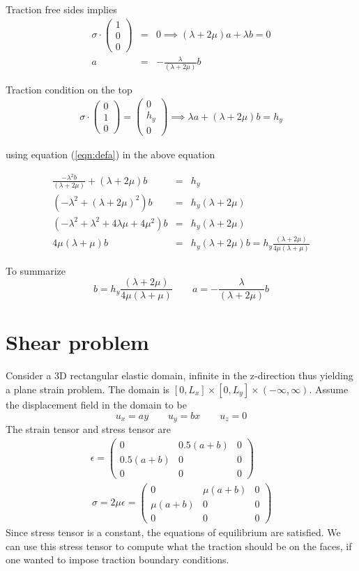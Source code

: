 \documentclass[12pt]{article}
\newcommand{\beq}{\begin{equation}}
\newcommand{\eeq}{\end{equation}}
\newcommand{\ber}{\begin{eqnarray}}
\newcommand{\eer}{\end{eqnarray}}
\begin{document}
      
 Traction free sides implies
      \ber
      \sigma\cdot\begin{pmatrix}1 \\ 0 \\ 0\end{pmatrix} &=& 0 \implies      (\lambda+2\mu)a + \lambda{b}=0 \\
      a &=& -\frac{\lambda}{(\lambda+2\mu)}b \label{eqn:defa}
      \eer

      Traction condition on the top
      \ber
      \sigma\cdot\begin{pmatrix}0\\1\\0\end{pmatrix} = \begin{pmatrix}0\\h_y\\0\end{pmatrix} \implies \lambda{a} + (\lambda+2\mu)b = h_y
        \eer

        using equation (\ref{eqn:defa}) in the above equation

        \ber
        \frac{-\lambda^2b}{(\lambda+2\mu)} + (\lambda+2\mu)b &=& h_y \\
        (-\lambda^2 + (\lambda+2\mu)^2)b &=& h_y(\lambda+2\mu)\\
        (-\lambda^2 + \lambda^2 + 4\lambda\mu + 4\mu^2)b &=& h_y(\lambda+2\mu)\\
        4\mu(\lambda+\mu)b &=& h_y(\lambda+2\mu)
        b = h_y\frac{(\lambda+2\mu)}{4\mu(\lambda+\mu)}
        \eer

        To summarize
        \beq
        b = h_y\frac{(\lambda+2\mu)}{4\mu(\lambda+\mu)} \qquad  a = -\frac{\lambda}{(\lambda+2\mu)}b 
        \eeq
\section{Shear problem}        
Consider a 3D rectangular elastic domain, infinite in the z-direction thus yielding a plane strain problem. The domain is  $[0,L_x]\times[0,L_y]\times(-\infty,\infty)$. Assume the displacement field in the domain to be
\beq
u_x = ay \qquad u_y = bx \qquad u_z = 0
\eeq
The strain tensor and stress tensor are
\ber
\epsilon = \begin{pmatrix}0 & 0.5(a+b) & 0\\ 0.5(a+b) & 0 & 0 \\ 0 & 0 & 0\end{pmatrix}\\  \, \sigma = 2\mu\epsilon = \begin{pmatrix}0 & \mu(a+b) & 0\\ \mu(a+b) & 0 & 0 \\ 0 & 0 & 0\end{pmatrix}  
\eer
Since stress tensor is a constant, the equations of equilibrium are satisfied. We can use this stress tensor to compute what the traction should be on the faces, if one wanted to impose traction boundary conditions. 
\end{document}
